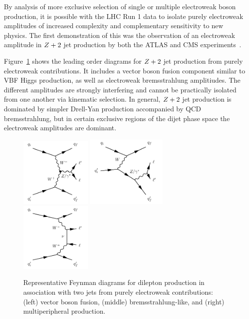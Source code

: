 By analysis of more exclusive selection of single or multiple electroweak boson production,
it is possible with the LHC Run 1 data to isolate purely electroweak amplitudes of
increased complexity and complementary sensitivity to new physics.  The first demonstration of
this was the observation of an electroweak amplitude in $Z+2$ jet production by both the
ATLAS and CMS experiments~\cite{Aad:2014dta, Khachatryan:2014dea}.

Figure~\ref{fig:ss-exclboson-z2j-sigdiagram} shows the leading order diagrams for $Z+2$ jet production
from purely electroweak contributions.  It includes a vector boson fusion component similar to
VBF Higgs production, as well as electroweak bremsstrahlung amplitiudes.  The different amplitudes
are strongly interfering and cannot be practically isolated from one another via kinematic selection.
In general, $Z+2$ jet production is dominated by simpler Drell-Yan production accompanied by QCD bremsstrahlung,
but in certain exclusive regions of the dijet phase space the electroweak amplitudes are dominant.

\begin{figure}[htb] {
\centering
\includegraphics[width=0.315\textwidth]{figures/ss-exclboson-z2j-vbfz_diagram.pdf}
\includegraphics[width=0.35\textwidth]{figures/ss-exclboson-z2j-bckg3_diagram.pdf}
\includegraphics[width=0.315\textwidth]{figures/ss-exclboson-z2j-bckg1_diagram.pdf}
\caption{
Representative Feynman diagrams for dilepton production in association
with two jets from purely electroweak contributions:
(left) vector boson fusion,
(middle) bremsstrahlung-like,
and (right) multiperipheral production.
\label{fig:ss-exclboson-z2j-sigdiagram}}

}
\end{figure}


